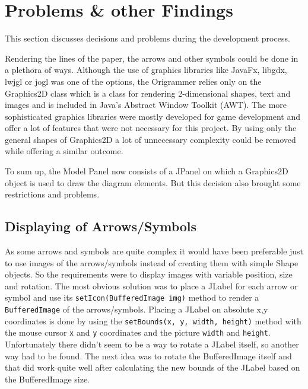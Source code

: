 
\section{Problems \& other Findings}
\label{sec:problems}

This section discusses decisions and problems during the development process.

Rendering the lines of the paper, the arrows and other symbols could be done in a plethora of ways. Although the use of graphics libraries like JavaFx, libgdx, lwjgl or jogl was one of the options, the Origrammer relies only on the Graphics2D class which is a class for rendering 2-dimensional shapes, text and images and is included in Java's Abstract Window Toolkit (AWT). The more sophisticated graphics libraries were mostly developed for game development and offer a lot of features that were not necessary for this project. By using only the general shapes of Graphics2D a lot of unnecessary complexity could be removed while offering a similar outcome.

To sum up, the Model Panel now consists of a JPanel on which a Graphics2D object is used to draw the diagram elements. But this decision also brought some restrictions and problems.

\subsection{Displaying of Arrows/Symbols}
\label{sec:displaySymbols}
As some arrows and symbols are quite complex it would have been preferable just to use images of the arrows/symbols instead of creating them with simple Shape objects. So the requirements were to display images with variable position, size and rotation. The most obvious solution was to place a JLabel for each arrow or symbol and use its \texttt{setIcon(BufferedImage img)} method to render a \texttt{BufferedImage} of the arrows/symbols. Placing a JLabel on absolute x,y coordinates is done by using the \texttt{setBounds(x, y, width, height)} method with the mouse cursor \texttt{x} and \texttt{y} coordinates and the picture \texttt{width} and \texttt{height}. Unfortunately there didn't seem to be a way to rotate a JLabel itself, so another way had to be found. The next idea was to rotate the BufferedImage itself and that did work quite well after calculating the new bounds of the JLabel based on the BufferedImage size.

